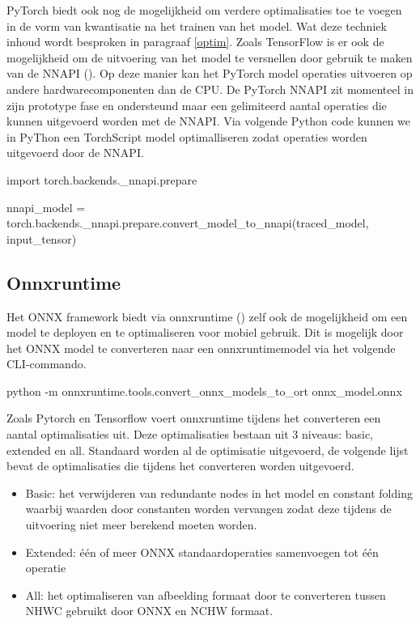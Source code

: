 PyTorch biedt ook nog de mogelijkheid om verdere optimalisaties toe te voegen in de vorm van kwantisatie na het trainen van het model.
Wat deze techniek inhoud wordt besproken in paragraaf \ref{optim}.
Zoals TensorFlow is er ook de mogelijkheid om de uitvoering van het model te versnellen door gebruik te maken van de NNAPI (\cite{Android_NNAPI_2021}).
Op deze manier kan het PyTorch model operaties uitvoeren op andere hardwarecomponenten dan de CPU.
De PyTorch NNAPI zit momenteel in zijn prototype fase en ondersteund maar een gelimiteerd aantal operaties die kunnen uitgevoerd worden met de NNAPI.
Via volgende Python code kunnen we in PyThon een TorchScript model optimalliseren zodat operaties worden uitgevoerd door de NNAPI.

\begin{python}
import torch.backends._nnapi.prepare

nnapi_model = torch.backends._nnapi.prepare.convert_model_to_nnapi(traced_model, input_tensor)
\end{python}

\subsection{Onnxruntime}
Het ONNX framework biedt via onnxruntime (\cite{onnx_onnxruntime_2019}) zelf ook de mogelijkheid om een model te deployen en te optimaliseren voor mobiel gebruik.
Dit is mogelijk door het ONNX model te converteren naar een onnxruntimemodel via het volgende CLI-commando.

\begin{python}
python -m onnxruntime.tools.convert_onnx_models_to_ort onnx_model.onnx
\end{python}

Zoals Pytorch en Tensorflow voert onnxruntime tijdens het converteren een aantal optimalisaties uit.
Deze optimalisaties bestaan uit 3 niveaus: basic, extended en all.
Standaard worden al de optimisatie uitgevoerd, de volgende lijst bevat de optimalisaties die tijdens het converteren worden uitgevoerd.

\begin{itemize}
	\item Basic: het verwijderen van redundante nodes in het model en constant folding waarbij waarden door constanten worden vervangen zodat deze tijdens de uitvoering niet meer berekend moeten worden.
	\item Extended: \'e\'en of meer ONNX standaardoperaties samenvoegen tot \'e\'en operatie 
	\item All: het optimaliseren van afbeelding formaat door te converteren tussen NHWC gebruikt door ONNX en NCHW formaat.
\end{itemize}

